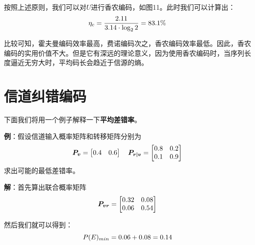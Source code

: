 \documentclass[UTF8,a4paper,11pt]{article}
\begin{document}
按照上述原则，我们可以对$U$进行香农编码，如图11。此时我们可以计算出：
\begin{equation}
\notag
\eta_c=\frac{2.11}{3.14\cdot\log_{2}{2}}=83.1\%
\end{equation}

比较可知，霍夫曼编码效率最高，费诺编码次之，香农编码效率最低。因此，香农编码的实用价值不大。但是它有深远的理论意义，因为使用香农编码时，当序列长度逼近无穷大时，平均码长会趋近于信源的熵。


\section{信道纠错编码}

下面我们将用一个例子解释一下\textbf{平均差错率}。

\textbf{例}：假设信道输入概率矩阵和转移矩阵分别为
\begin{equation}
\notag
\bm{P_v}=
\begin{bmatrix}
0.4&0.6\\
\end{bmatrix}
\quad
\bm{P_{r|v}}=
\begin{bmatrix}
0.8&0.2\\
0.1&0.9\\
\end{bmatrix}
\end{equation}
求出可能的最低差错率。

\textbf{解}：首先算出联合概率矩阵
\begin{equation}
\notag
\bm{P_{vr}}=
\begin{bmatrix}
0.32&0.08\\
0.06&0.54\\
\end{bmatrix}
\end{equation}

然后我们就可以得到：
\begin{equation}
\notag
P(E)_{min}=0.06+0.08=0.14
\end{equation}
\end{document}
